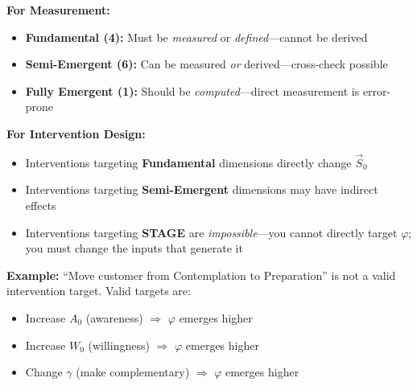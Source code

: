 \begin{tcolorbox}[colback=green!5!white, colframe=green!75!black,
    title=\textbf{Practical Implications of the Emergence Classification}]

\textbf{For Measurement:}
\begin{itemize}[nosep]
    \item \textbf{Fundamental (4):} Must be \textit{measured} or \textit{defined}---cannot be derived
    \item \textbf{Semi-Emergent (6):} Can be measured \textit{or} derived---cross-check possible
    \item \textbf{Fully Emergent (1):} Should be \textit{computed}---direct measurement is error-prone
\end{itemize}

\textbf{For Intervention Design:}
\begin{itemize}[nosep]
    \item Interventions targeting \textbf{Fundamental} dimensions directly change $\vec{S}_0$
    \item Interventions targeting \textbf{Semi-Emergent} dimensions may have indirect effects
    \item Interventions targeting \textbf{STAGE} are \textit{impossible}---you cannot directly target $\varphi$; you must change the inputs that generate it
\end{itemize}

\textbf{Example:} ``Move customer from Contemplation to Preparation'' is not a valid intervention target. Valid targets are:
\begin{itemize}[nosep]
    \item Increase $A_0$ (awareness) $\Rightarrow$ $\varphi$ emerges higher
    \item Increase $W_0$ (willingness) $\Rightarrow$ $\varphi$ emerges higher
    \item Change $\gamma$ (make complementary) $\Rightarrow$ $\varphi$ emerges higher
\end{itemize}

\end{tcolorbox}


